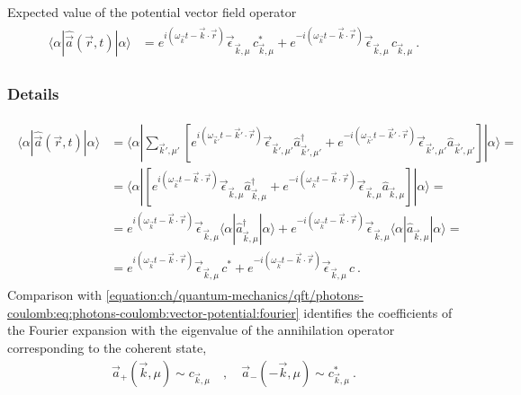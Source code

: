 \documentclass[letterpaper,10pt,english]{jupyterBook}
\begin{document}
\sphinxAtStartPar
Expected value of the potential vector field operator
\begin{equation*}
\begin{split}\begin{aligned}
  \langle \alpha | \hat{\vec{a}}(\vec{r},t) | \alpha \rangle
  & =  e^{i ( \omega_{\vec{k}} t - \vec{k} \cdot \vec{r} )} \vec{\epsilon}_{\vec{k}, \mu} \, c^*_{\vec{k},\mu} + e^{- i ( \omega_{\vec{k}} t - \vec{k} \cdot \vec{r})} \vec{\epsilon}_{\vec{k},\mu} \, c_{\vec{k},\mu} \ .
\end{aligned}\end{split}
\end{equation*}\subsubsection*{Details}
\begin{equation*}
\begin{split}\begin{aligned}
  \langle \alpha | \hat{\vec{a}}(\vec{r},t) | \alpha \rangle
  & = \langle \alpha | \sum_{\vec{k}', \mu'} \left[ e^{i ( \omega_{\vec{k}'} t - \vec{k}' \cdot \vec{r} )} \vec{\epsilon}_{\vec{k}', \mu'} \hat{a}^\dagger_{\vec{k}',\mu'} + e^{- i ( \omega_{\vec{k}'} t - \vec{k}' \cdot \vec{r})} \vec{\epsilon}_{\vec{k}',\mu'} \hat{a}_{\vec{k}',\mu'} \right] | \alpha \rangle = \\
  & = \langle \alpha | \left[ e^{i ( \omega_{\vec{k}} t - \vec{k} \cdot \vec{r} )} \vec{\epsilon}_{\vec{k}, \mu} \hat{a}^\dagger_{\vec{k},\mu} + e^{- i ( \omega_{\vec{k}} t - \vec{k} \cdot \vec{r})} \vec{\epsilon}_{\vec{k},\mu} \hat{a}_{\vec{k},\mu} \right] | \alpha \rangle = \\
  & =  e^{i ( \omega_{\vec{k}} t - \vec{k} \cdot \vec{r} )} \vec{\epsilon}_{\vec{k}, \mu} \langle \alpha | \hat{a}^\dagger_{\vec{k},\mu} | \alpha \rangle + e^{- i ( \omega_{\vec{k}} t - \vec{k} \cdot \vec{r})} \vec{\epsilon}_{\vec{k},\mu} \langle \alpha | \hat{a}_{\vec{k},\mu} | \alpha \rangle = \\
  & =  e^{i ( \omega_{\vec{k}} t - \vec{k} \cdot \vec{r} )} \vec{\epsilon}_{\vec{k}, \mu} \, c^* + e^{- i ( \omega_{\vec{k}} t - \vec{k} \cdot \vec{r})} \vec{\epsilon}_{\vec{k},\mu} \, c \ .
\end{aligned}\end{split}
\end{equation*}
\sphinxAtStartPar
Comparison with \eqref{equation:ch/quantum-mechanics/qft/photons-coulomb:eq:photons-coulomb:vector-potential:fourier} identifies the coefficients of the Fourier expansion with the eigenvalue of the annihilation operator corresponding to the coherent state,
\begin{equation*}
\begin{split}
\vec{a}_+(\vec{k},\mu) \sim c_{\vec{k},\mu}
\quad , \quad
\vec{a}_-(-\vec{k},\mu) \sim c^*_{\vec{k},\mu} \ .
\end{split}
\end{equation*}
\sphinxstepscope
\end{document}
